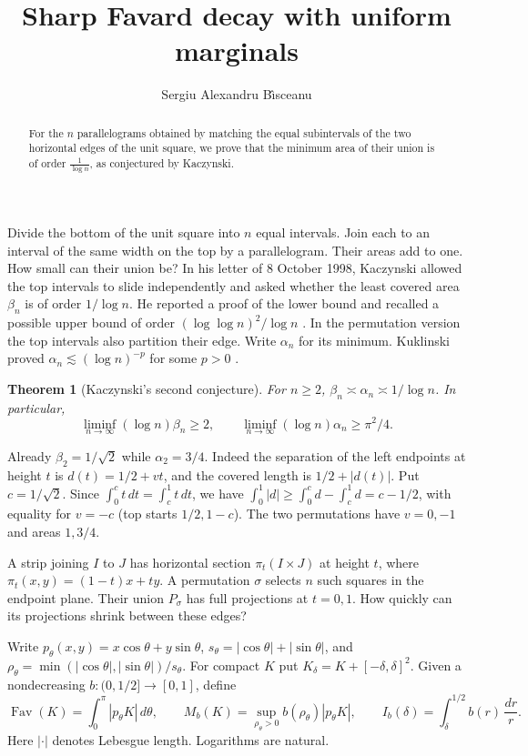 \documentclass[11pt,reqno]{amsart}
\title{Sharp Favard decay with uniform marginals}
\author{Sergiu Alexandru B\^{\i}sceanu}
\date{}
\newtheorem{theorem}{Theorem}
\newcommand{\Fav}{\operatorname{Fav}}
\begin{document}
\begin{abstract}
For the $n$ parallelograms obtained by matching the equal subintervals of the
two horizontal edges of the unit square, we prove that the minimum area of
their union is of order $\frac1{\log n}$, as conjectured by Kaczynski.
\end{abstract}
\maketitle
\pagestyle{plain}
\raggedbottom
{}

Divide the bottom of the unit square into $n$ equal intervals. Join each to an interval of the same width on the top by a parallelogram. Their areas add to one. How small can their union be? In his letter of 8 October 1998, Kaczynski allowed the top intervals to slide independently and asked whether the least covered area $\beta_n$ is of order $1/\log n$. He reported a proof of the lower bound and recalled a possible upper bound of order $(\log\log n)^2/\log n$ \cite[pp.~27--29]{Letter}. In the permutation version the top intervals also partition their edge. Write $\alpha_n$ for its minimum. Kuklinski proved $\alpha_n\lesssim(\log n)^{-p}$ for some $p>0$ \cite[Conjecture~2 and Theorem~4]{Kuklinski}.

\begin{theorem}[Kaczynski's second conjecture]\label{thm:area}
For $n\ge2$, $\beta_n\asymp\alpha_n\asymp1/\log n$. In particular,
\[
 \liminf_{n\to\infty}(\log n)\beta_n\ge2,\qquad
 \liminf_{n\to\infty}(\log n)\alpha_n\ge\pi^2/4 .
\]
\end{theorem}

Already $\beta_2=1/\sqrt2$ while $\alpha_2=3/4$. Indeed the separation of the left endpoints at height $t$ is $d(t)=1/2+vt$, and the covered length is $1/2+|d(t)|$. Put $c=1/\sqrt2$. Since $\int_0^c t\,dt=\int_c^1t\,dt$, we have $\int_0^1|d|\ge\int_0^c d-\int_c^1d=c-1/2$, with equality for $v=-c$ (top starts $1/2,1-c$). The two permutations have $v=0,-1$ and areas $1,3/4$.

A strip joining $I$ to $J$ has horizontal section $\pi_t(I\times J)$ at height $t$, where $\pi_t(x,y)=(1-t)x+ty$. A permutation $\sigma$ selects $n$ such squares in the endpoint plane. Their union $P_\sigma$ has full projections at $t=0,1$. How quickly can its projections shrink between these edges?

Write $p_\theta(x,y)=x\cos\theta+y\sin\theta$, $s_\theta=|\cos\theta|+|\sin\theta|$, and $\rho_\theta=\min(|\cos\theta|,|\sin\theta|)/s_\theta$. For compact $K$ put $K_\delta=K+[-\delta,\delta]^2$. Given a nondecreasing $b:(0,1/2]\to[0,1]$, define
\[
 \Fav(K)=\int_0^\pi |p_\theta K|\,d\theta,\qquad
 M_b(K)=\sup_{\rho_\theta>0} b(\rho_\theta)|p_\theta K|,\qquad
 I_b(\delta)=\int_\delta^{1/2} b(r)\,\frac{dr}{r}.
\]
Here $|\cdot|$ denotes Lebesgue length. Logarithms are natural.
\end{document}
